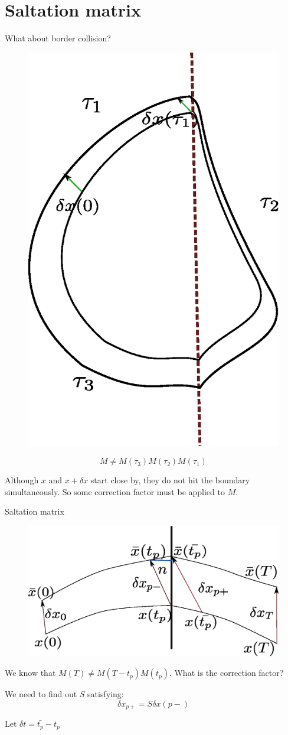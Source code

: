 \documentclass[xcolor=x11names,compress]{beamer}
\renewcommand{\(}{\begin{columns}}
\renewcommand{\)}{\end{columns}}
\newcommand{\<}[1]{\begin{column}{#1}}
\renewcommand{\>}{\end{column}}
\begin{document}
\section{Saltation matrix}
\begin{frame}{What about border collision?}
\begin{figure}
\begin{center}
\includegraphics[width=0.3\columnwidth]{border-c}
\end{center}
\end{figure}

\[
M\neq M(\tau_3)M(\tau_2)M(\tau_1)
\]

Although $x$ and $x+\delta x$ start close by, they do not hit the boundary 
simultaneously. So some correction factor must be applied to $M$.  

\end{frame}

\begin{frame}{Saltation matrix}
\begin{figure}
\begin{center}
\includegraphics[width=0.6\columnwidth]{saltation}
\end{center}
\end{figure}

We know that $M(T)\neq M(T-t_p)M(t_p)$.  What is the correction factor?\\
\pause{}

We need to find out $S$ satisfying:
\[
\delta x_{p+}=S\delta  x(p-)
\]

Let $\delta t=\bar{t_p}-t_p$\\
\end{frame}
\end{document}
